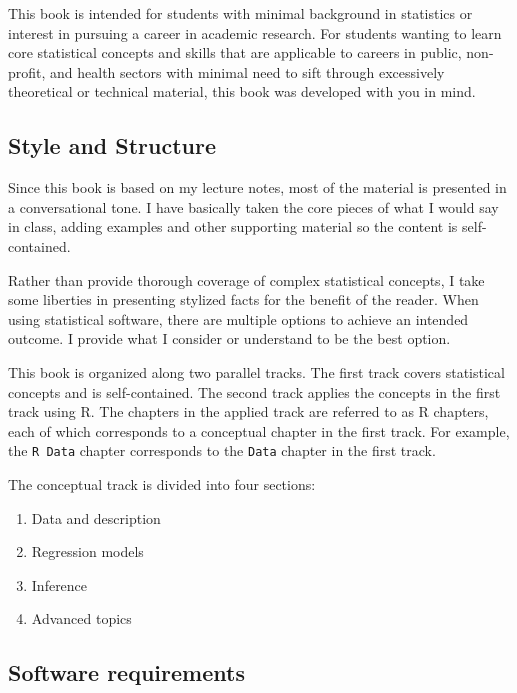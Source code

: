 \documentclass[
]{book}
\providecommand{\tightlist}{%
  \setlength{\itemsep}{0pt}\setlength{\parskip}{0pt}}
\begin{document}
This book is intended for students with minimal background in statistics or interest in pursuing a career in academic research. For students wanting to learn core statistical concepts and skills that are applicable to careers in public, non-profit, and health sectors with minimal need to sift through excessively theoretical or technical material, this book was developed with you in mind.

\hypertarget{style-and-structure}{%
\subsection*{Style and Structure}\label{style-and-structure}}

Since this book is based on my lecture notes, most of the material is presented in a conversational tone. I have basically taken the core pieces of what I would say in class, adding examples and other supporting material so the content is self-contained.

Rather than provide thorough coverage of complex statistical concepts, I take some liberties in presenting stylized facts for the benefit of the reader. When using statistical software, there are multiple options to achieve an intended outcome. I provide what I consider or understand to be the best option.

This book is organized along two parallel tracks. The first track covers statistical concepts and is self-contained. The second track applies the concepts in the first track using R. The chapters in the applied track are referred to as R chapters, each of which corresponds to a conceptual chapter in the first track. For example, the \texttt{R\ Data} chapter corresponds to the \texttt{Data} chapter in the first track.

The conceptual track is divided into four sections:

\begin{enumerate}
\def\labelenumi{\arabic{enumi}.}
\tightlist
\item
  Data and description
\item
  Regression models
\item
  Inference
\item
  Advanced topics
\end{enumerate}

\hypertarget{software-requirements}{%
\subsection*{Software requirements}\label{software-requirements}}
\end{document}
